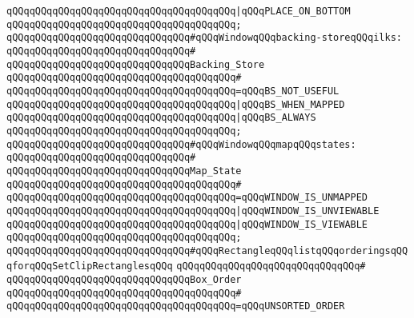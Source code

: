 \verb|qQQqqQQqqQQqqQQqqQQqqQQqqQQqqQQqqQQqqQQq|\verb#|qQQqPLACE_ON_BOTTOM#\newline
\verb|qQQqqQQqqQQqqQQqqQQqqQQqqQQqqQQqqQQqqQQq;|\newline
\newline
\verb|qQQqqQQqqQQqqQQqqQQqqQQqqQQqqQQq#qQQqWindowqQQqbacking-storeqQQqilks:|\newline
\verb|qQQqqQQqqQQqqQQqqQQqqQQqqQQqqQQq#|\newline
\verb|qQQqqQQqqQQqqQQqqQQqqQQqqQQqqQQqBacking_Store|\newline
\verb|qQQqqQQqqQQqqQQqqQQqqQQqqQQqqQQqqQQqqQQq#|\newline
\verb|qQQqqQQqqQQqqQQqqQQqqQQqqQQqqQQqqQQqqQQq=qQQqBS_NOT_USEFUL|\newline
\verb|qQQqqQQqqQQqqQQqqQQqqQQqqQQqqQQqqQQqqQQq|\verb#|qQQqBS_WHEN_MAPPED#\newline
\verb|qQQqqQQqqQQqqQQqqQQqqQQqqQQqqQQqqQQqqQQq|\verb#|qQQqBS_ALWAYS#\newline
\verb|qQQqqQQqqQQqqQQqqQQqqQQqqQQqqQQqqQQqqQQq;|\newline
\newline
\verb|qQQqqQQqqQQqqQQqqQQqqQQqqQQqqQQq#qQQqWindowqQQqmapqQQqstates:|\newline
\verb|qQQqqQQqqQQqqQQqqQQqqQQqqQQqqQQq#|\newline
\verb|qQQqqQQqqQQqqQQqqQQqqQQqqQQqqQQqMap_State|\newline
\verb|qQQqqQQqqQQqqQQqqQQqqQQqqQQqqQQqqQQqqQQq#|\newline
\verb|qQQqqQQqqQQqqQQqqQQqqQQqqQQqqQQqqQQqqQQq=qQQqWINDOW_IS_UNMAPPED|\newline
\verb|qQQqqQQqqQQqqQQqqQQqqQQqqQQqqQQqqQQqqQQq|\verb#|qQQqWINDOW_IS_UNVIEWABLE#\newline
\verb|qQQqqQQqqQQqqQQqqQQqqQQqqQQqqQQqqQQqqQQq|\verb#|qQQqWINDOW_IS_VIEWABLE#\newline
\verb|qQQqqQQqqQQqqQQqqQQqqQQqqQQqqQQqqQQqqQQq;|\newline
\newline
\verb|qQQqqQQqqQQqqQQqqQQqqQQqqQQqqQQq#qQQqRectangleqQQqlistqQQqorderingsqQQqforqQQqSetClipRectanglesqQQq|\newline
\verb|qQQqqQQqqQQqqQQqqQQqqQQqqQQqqQQq#|\newline
\verb|qQQqqQQqqQQqqQQqqQQqqQQqqQQqqQQqBox_Order|\newline
\verb|qQQqqQQqqQQqqQQqqQQqqQQqqQQqqQQqqQQqqQQq#|\newline
\verb|qQQqqQQqqQQqqQQqqQQqqQQqqQQqqQQqqQQqqQQq=qQQqUNSORTED_ORDER|\newline
